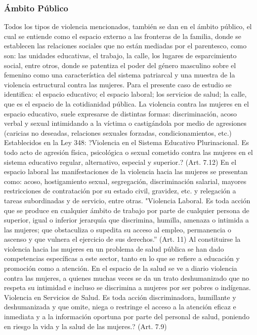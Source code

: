 \subsubsection{Ámbito Público}
Todos los tipos de violencia mencionados, también se dan en el ámbito público, el cual se entiende como el espacio externo a las fronteras de la familia, donde se establecen las relaciones sociales que no están mediadas
por el parentesco, como son: las unidades educativas, el trabajo, la calle, los lugares de esparcimiento social, entre otros, donde se patentiza el poder del género masculino sobre el femenino como una característica del sistema
patriarcal y una muestra de la violencia estructural contra las mujeres.
Para el presente caso de estudio se identifica: el espacio educativo; el espacio laboral; los servicios de salud; la calle, que es el espacio de la cotidianidad pública. 
La violencia contra las mujeres en el espacio educativo, suele expresarse de distintas formas: discriminación, acoso verbal y sexual intimidando a la víctima o castigándola por medio de agresiones (caricias no deseadas, relaciones sexuales forzadas, condicionamientos, etc.) Establecidos
en la Ley 348:
?Violencia en el Sistema Educativo Plurinacional. Es todo acto de agresión física, psicológica o sexual cometido contra las mujeres en el sistema educativo regular, alternativo, especial y superior.? (Art. 7.12)
En el espacio laboral las manifestaciones de la violencia hacia las mujeres se presentan como: acoso, hostigamiento sexual, segregación, discriminación salarial, mayores restricciones de contratación por su estado civil, gravidez, etc. y relegación a tareas subordinadas y de servicio, entre
otras. "Violencia Laboral. Es toda acción que se produce en cualquier ámbito de trabajo por parte de cualquier persona de superior, igual o inferior jerarquía que discrimina, humilla, amenaza o intimida a las mujeres;
que obstaculiza o supedita su acceso al empleo, permanencia o ascenso y que vulnera el ejercicio de sus derechos.'' (Art. 11)
Al constituirse la violencia hacia las mujeres en un problema de salud pública se han dado competencias específicas a este sector, tanto en lo que se refiere a educación y promoción como a atención. En el espacio de la salud se ve a diario violencia contra las mujeres, a quienes muchas veces se da un trato deshumanizado que no respeta su intimidad e incluso se discrimina a mujeres por ser pobres o indígenas.
Violencia en Servicios de Salud. Es toda acción discriminadora, humillante y deshumanizada y que omite, niega o restringe el acceso a la atención eficaz e inmediata y a la información oportuna por parte del personal de salud, poniendo en riesgo la vida y la salud de las mujeres.? (Art. 7.9)
